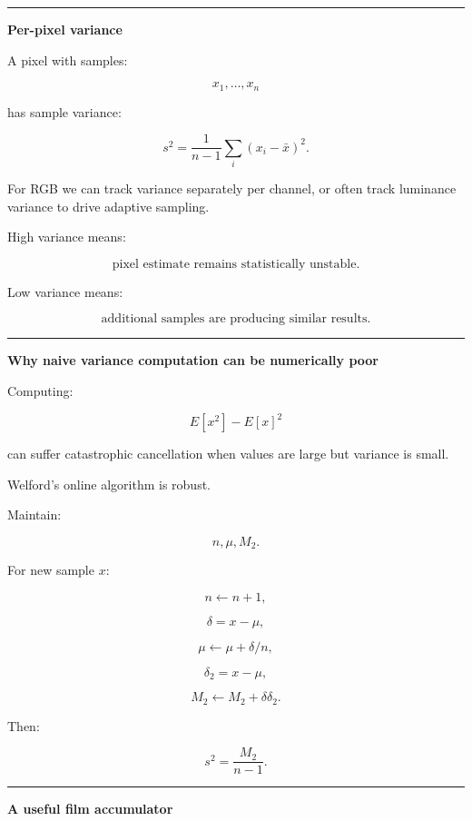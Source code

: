 \begin{center}\rule{0.5\linewidth}{0.5pt}\end{center}

\textbf{Per-pixel variance}

A pixel with samples:

\[
x_1,\dots,x_n
\]

has sample variance:

\[
\boxed{
s^2
=
\frac{
1
}{
n-1
}
\sum_i
(x_i-\bar x)^2.
}
\]

For RGB we can track variance separately per channel, or often track luminance variance to drive adaptive sampling.

High variance means:

\[
\text{pixel estimate remains statistically unstable}.
\]

Low variance means:

\[
\text{additional samples are producing similar results}.
\]

\begin{center}\rule{0.5\linewidth}{0.5pt}\end{center}

\textbf{Why naive variance computation can be numerically poor}

Computing:

\[
E[x^2]-E[x]^2
\]

can suffer catastrophic cancellation when values are large but variance is small.

Welford's online algorithm is robust.

Maintain:

\[
n,\mu,M_2.
\]

For new sample \(x\):

\[
n\leftarrow n+1,
\]

\[
\delta=x-\mu,
\]

\[
\mu\leftarrow\mu+\delta/n,
\]

\[
\delta_2=x-\mu,
\]

\[
M_2\leftarrow M_2+\delta\delta_2.
\]

Then:

\[
\boxed{
s^2=
\frac{M_2}{n-1}.
}
\]

\begin{center}\rule{0.5\linewidth}{0.5pt}\end{center}

\textbf{A useful film accumulator}

